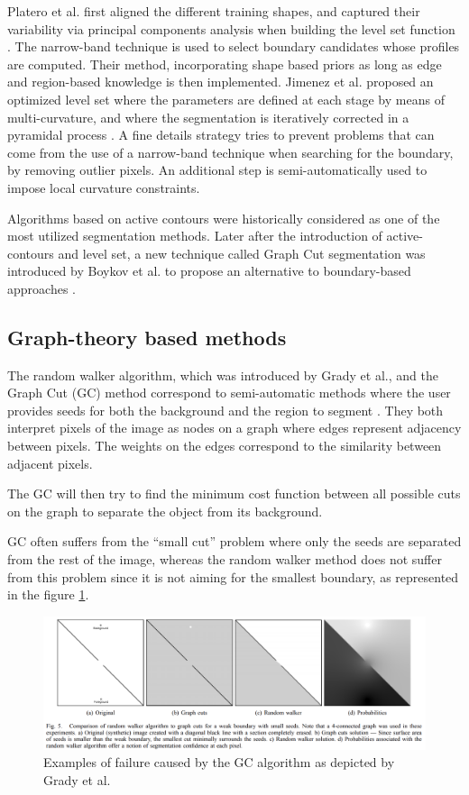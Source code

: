 \documentclass[]{article}
\begin{document}
Platero et al. first aligned the different training shapes, and captured
their variability via principal components analysis when building the
level set function \cite{Platero2011}. The narrow-band technique is used to select boundary
candidates whose profiles are computed. Their method, incorporating
shape based priors as long as edge and region-based knowledge is then
implemented.
Jimenez et al. proposed an optimized level set where the parameters are
defined at each stage by means of multi-curvature, and where the
segmentation is iteratively corrected in a pyramidal process \cite{Jimenez-Carretero2011}. A fine
details strategy tries to prevent problems that can come from the use of
a narrow-band technique when searching for the boundary, by removing
outlier pixels. An additional step is semi-automatically used to impose
local curvature constraints.

Algorithms based on active contours were historically considered as one
of the most utilized segmentation methods. Later after the introduction
of active-contours and level set, a new technique called Graph Cut
segmentation was introduced by Boykov et al. to propose an alternative to boundary-based approaches \cite{Boykov2001}.

\subsection*{Graph-theory based methods}

The random walker algorithm, which was introduced by Grady et al., and the Graph Cut (GC) method correspond to
semi-automatic methods where the user provides seeds for both the
background and the region to segment \cite{Grady2006}. They both interpret pixels of the
image as nodes on a graph where edges represent adjacency between
pixels. The weights on the edges correspond to the similarity between
adjacent pixels.

The GC will then try to find the minimum cost function between all
possible cuts on the graph to separate the object from its background.

GC often suffers from the ``small cut'' problem where only the seeds are
separated from the rest of the image, whereas the random walker method
does not suffer from this problem since it is not aiming for the
smallest boundary, as represented in the figure \ref{Grady2006_Fig5}.

\begin{figure}[th!]
	\centering
	\includegraphics[width=0.7\linewidth]{images/image20}
	\caption{Examples of failure caused by the GC algorithm as depicted by Grady et al. \cite{Grady2006}}
	\label{Grady2006_Fig5}
\end{figure}
\end{document}
